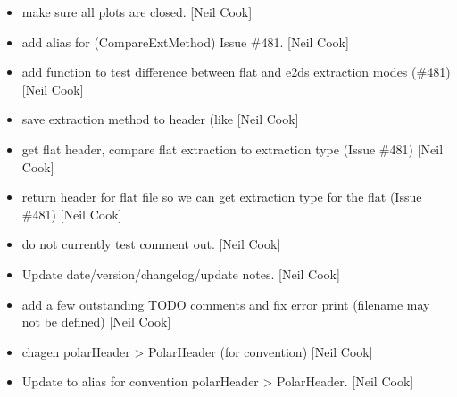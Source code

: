 \documentclass[a4paper,10pt,english]{report}
\begin{document}
\label{\detokenize{misc/changelog:id317}}\begin{itemize}
\item {} 
 \sphinxhyphen{} make sure all plots are closed. {[}Neil Cook{]}

\item {} 
 \sphinxhyphen{} add alias for 
(CompareExtMethod) \sphinxhyphen{} Issue \#481. {[}Neil Cook{]}

\item {} 
 \sphinxhyphen{} add  function to test
difference between flat and e2ds extraction modes (\#481) {[}Neil Cook{]}

\item {} 
 \sphinxhyphen{} save extraction method to header (like
 {[}Neil Cook{]}

\item {} 
 \sphinxhyphen{} get flat header, compare flat extraction
to extraction type  (Issue \#481) {[}Neil Cook{]}

\item {} 
 \sphinxhyphen{} return header for flat file so we can get extraction
type for the flat (Issue \#481) {[}Neil Cook{]}

\item {} 
 \sphinxhyphen{} do not currently test  \sphinxhyphen{}
comment out. {[}Neil Cook{]}

\item {} 
Update date/version/changelog/update notes. {[}Neil Cook{]}

\item {} 
 \sphinxhyphen{} add a few outstanding TODO comments and fix error print
(filename may not be defined) {[}Neil Cook{]}

\item {} 
 \sphinxhyphen{} chagen polarHeader \textendash{}\textgreater{} PolarHeader (for
convention) {[}Neil Cook{]}

\item {} 
 \sphinxhyphen{} Update to alias for convention polarHeader \textendash{}\textgreater{}
PolarHeader. {[}Neil Cook{]}


\end{itemize}
\end{document}
